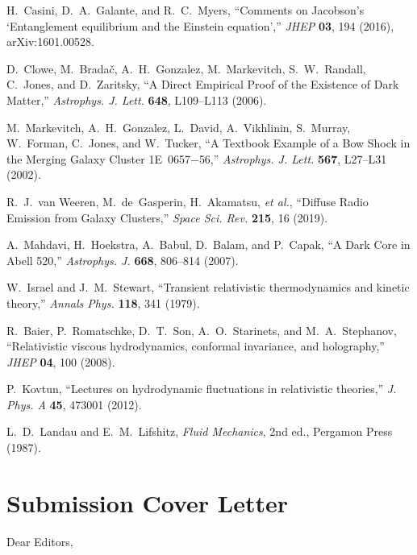 \documentclass[aps,prd,onecolumn,superscriptaddress,nofootinbib]{revtex4-2}
\begin{document}
\begin{thebibliography}{99}
H.~Casini, D.~A.~Galante, and R.~C.~Myers,
``Comments on Jacobson's `Entanglement equilibrium and the Einstein equation',''
\emph{JHEP} \textbf{03}, 194 (2016), arXiv:1601.00528.

D.~Clowe, M.~Brada\v{c}, A.~H.~Gonzalez, M.~Markevitch, S.~W.~Randall, C.~Jones, and D.~Zaritsky,
``A Direct Empirical Proof of the Existence of Dark Matter,''
\emph{Astrophys. J. Lett.} \textbf{648}, L109–L113 (2006).

M.~Markevitch, A.~H.~Gonzalez, L.~David, A.~Vikhlinin, S.~Murray, W.~Forman, C.~Jones, and W.~Tucker,
``A Textbook Example of a Bow Shock in the Merging Galaxy Cluster 1E~0657$-$56,''
\emph{Astrophys. J. Lett.} \textbf{567}, L27–L31 (2002).

R.~J.~van Weeren, M.~de~Gasperin, H.~Akamatsu, \emph{et al.},
``Diffuse Radio Emission from Galaxy Clusters,''
\emph{Space Sci. Rev.} \textbf{215}, 16 (2019).

A.~Mahdavi, H.~Hoekstra, A.~Babul, D.~Balam, and P.~Capak,
``A Dark Core in Abell 520,''
\emph{Astrophys. J.} \textbf{668}, 806–814 (2007).

W.~Israel and J.~M.~Stewart,
``Transient relativistic thermodynamics and kinetic theory,''
\emph{Annals Phys.} \textbf{118}, 341 (1979).

R.~Baier, P.~Romatschke, D.~T.~Son, A.~O.~Starinets, and M.~A.~Stephanov,
``Relativistic viscous hydrodynamics, conformal invariance, and holography,''
\emph{JHEP} \textbf{04}, 100 (2008).

P.~Kovtun,
``Lectures on hydrodynamic fluctuations in relativistic theories,''
\emph{J. Phys. A} \textbf{45}, 473001 (2012).

L.~D.~Landau and E.~M.~Lifshitz,
\emph{Fluid Mechanics}, 2nd ed., Pergamon Press (1987).

\end{thebibliography}

\iffalse
\section*{Submission Cover Letter}
Dear Editors,
\end{document}
